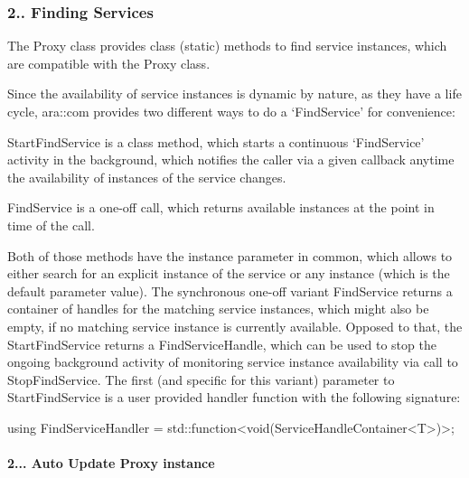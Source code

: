 \subsubsection*{2.. Finding Services}


\begin{DoxyItemize}
\item The Proxy class provides class (static) methods to find service instances, which are compatible with the Proxy class.
\item Since the availability of service instances is dynamic by nature, as they have a life cycle, ara\+::com provides two different ways to do a ‘\+Find\+Service’ for convenience\+:
\begin{DoxyItemize}
\item Start\+Find\+Service is a class method, which starts a continuous ‘\+Find\+Service’ activity in the background, which notifies the caller via a given callback anytime the availability of instances of the service changes.
\item Find\+Service is a one-\/off call, which returns available instances at the point in time of the call.
\end{DoxyItemize}
\item Both of those methods have the instance parameter in common, which allows to either search for an explicit instance of the service or any instance (which is the default parameter value). The synchronous one-\/off variant Find\+Service returns a container of handles for the matching service instances, which might also be empty, if no matching service instance is currently available. Opposed to that, the Start\+Find\+Service returns a Find\+Service\+Handle, which can be used to stop the ongoing background activity of monitoring service instance availability via call to Stop\+Find\+Service. The first (and specific for this variant) parameter to Start\+Find\+Service is a user provided handler function with the following signature\+:
\end{DoxyItemize}


\begin{DoxyCode}
\textcolor{keyword}{using} FindServiceHandler = std::function<void(ServiceHandleContainer<T>)>;
\end{DoxyCode}


\paragraph*{2... Auto Update Proxy instance}


